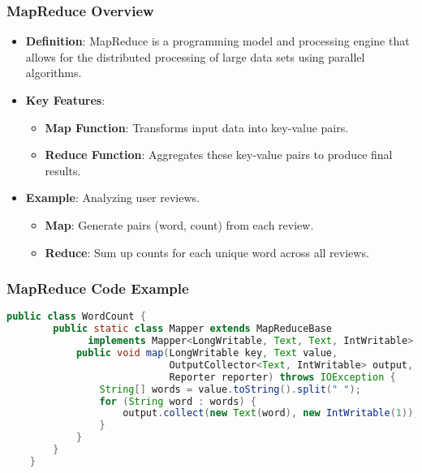 \documentclass[aspectratio=169]{beamer}
\begin{document}
\begin{frame}[fragile]
    \frametitle{MapReduce Overview}
    \begin{itemize}
        \item \textbf{Definition}: MapReduce is a programming model and processing engine that allows for the distributed processing of large data sets using parallel algorithms.
        \item \textbf{Key Features}:
        \begin{itemize}
            \item \textbf{Map Function}: Transforms input data into key-value pairs.
            \item \textbf{Reduce Function}: Aggregates these key-value pairs to produce final results.
        \end{itemize}
        \item \textbf{Example}: Analyzing user reviews.
        \begin{itemize}
            \item \textbf{Map}: Generate pairs (word, count) from each review.
            \item \textbf{Reduce}: Sum up counts for each unique word across all reviews.
        \end{itemize}
    \end{itemize}
\end{frame}

\begin{frame}[fragile]
    \frametitle{MapReduce Code Example}
    \begin{lstlisting}[language=Java]
    public class WordCount {
        public static class Mapper extends MapReduceBase 
              implements Mapper<LongWritable, Text, Text, IntWritable> {
            public void map(LongWritable key, Text value, 
                            OutputCollector<Text, IntWritable> output, 
                            Reporter reporter) throws IOException {
                String[] words = value.toString().split(" ");
                for (String word : words) {
                    output.collect(new Text(word), new IntWritable(1));
                }
            }
        }
    }
    \end{lstlisting}
\end{frame}
\end{document}
